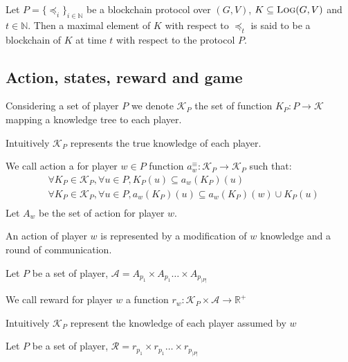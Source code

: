 

\begin{mydef}
Let $P = \{ \preceq_i\}_{i \in \mathbb{N}}$ be a blockchain protocol over $(G,V)$, $K \subseteq \text{\sc Log}(G,V)$ and $t \in \mathbb{N}$. 
Then a maximal element of $K$ with respect to $\preceq_t$ is said to be a blockchain of $K$ at time $t$ with respect to the protocol $P$.
\end{mydef}




\subsection{Action, states, reward and game}

\begin{mydef}
	Considering a set of player $P$ we denote $\mathcal{K}_P$ the set of function $K_P : P \rightarrow \mathcal{K}$ mapping a knowledge tree to each player. 
\end{mydef}

Intuitively $\mathcal{K}_P$ represents the true knowledge of each player.

\begin{mydef}
	We call action a for player $w\in P$ function $a^\equiv_w: \mathcal{K}_P \rightarrow \mathcal{K}_P$ such that: 
	\begin{eqnarray*}	
		&\forall K_P \in \mathcal{K}_P, \forall u \in P, K_P(u) \subseteq a_w(K_P)(u)  \\
		&\forall K_P \in \mathcal{K}_P, \forall u \in P, a_w(K_P)(u) \subseteq a_w(K_P)(w) \cup K_P(u)  \\
	\end{eqnarray*}
	Let $A_w$ be the set of action for player $w$.
\end{mydef}
An action of player $w$ is represented by a modification of $w$ knowledge and a round of communication. 

\begin{mydef}
	Let $P$ be a set of player, $\mathcal{A} = A_{p_1} \times A_{p_1} \ldots \times A_{p_{|P|}}$
\end{mydef}

\begin{mydef}
	We call reward for player $w$ a function $r_w : \mathcal{K}_P \times \mathcal{A} \rightarrow \mathbb{R}^+$ 
\end{mydef}
Intuitively $\mathcal{K}_P$ represent the knowledge of each player assumed by $w$

\begin{mydef}
	Let $P$ be a set of player, $\mathcal{R} = r_{p_1} \times r_{p_1} \ldots \times r_{p_{|P|}}$
\end{mydef}

